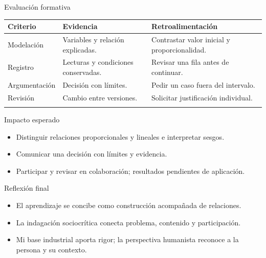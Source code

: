 \documentclass[
	spanish,
	aspectratio=1610,
	xcolor={dvipsnames,table}
]{beamer}
\begin{document}
\begin{frame}{Evaluación formativa}
\small\renewcommand{\arraystretch}{1.45}\begin{tabularx}{\linewidth}{X|X|X}\toprule
\textbf{Criterio} & \textbf{Evidencia} & \textbf{Retroalimentación}\\\midrule
Modelación & Variables y relación explicadas. & Contrastar valor inicial y proporcionalidad.\\\addlinespace
Registro & Lecturas y condiciones conservadas. & Revisar una fila antes de continuar.\\\addlinespace
Argumentación & Decisión con límites. & Pedir un caso fuera del intervalo.\\\addlinespace
Revisión & Cambio entre versiones. & Solicitar justificación individual.\\\addlinespace
\bottomrule\end{tabularx}
\end{frame}
\begin{frame}{Impacto esperado}
\fontsize{14}{18}\selectfont\begin{itemize}\setlength{\itemsep}{.45cm}
\item Distinguir relaciones proporcionales y lineales e interpretar sesgos.
\item Comunicar una decisión con límites y evidencia.
\item Participar y revisar en colaboración; resultados pendientes de aplicación.
\end{itemize}
\end{frame}
\begin{frame}{Reflexión final}
\fontsize{14}{18}\selectfont\begin{itemize}\setlength{\itemsep}{.45cm}
\item El aprendizaje se concibe como construcción acompañada de relaciones.
\item La indagación sociocrítica conecta problema, contenido y participación.
\item Mi base industrial aporta rigor; la perspectiva humanista reconoce a la persona y su contexto.
\end{itemize}
\end{frame}
\end{document}
